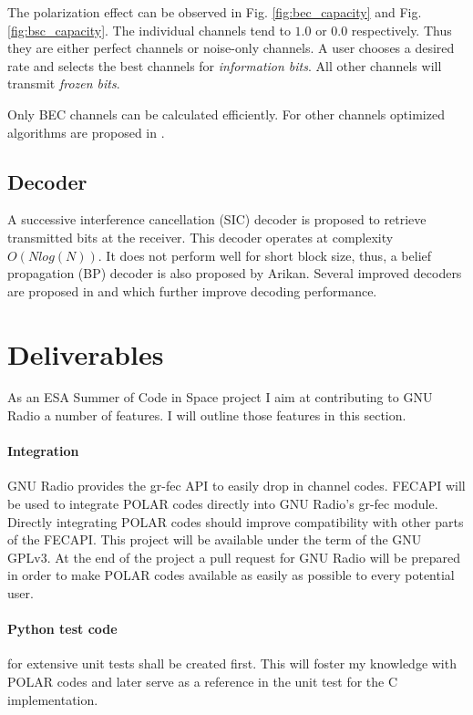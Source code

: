 \documentclass[a4paper,12pt]{scrartcl}
\def\CC{{C\nolinebreak[4]\hspace{-.05em}\raisebox{.4ex}{\tiny\textbf{++}}}}
\begin{document}
The polarization effect can be observed in Fig. \ref{fig:bec_capacity} and Fig. \ref{fig:bsc_capacity}.
The individual channels tend to $1.0$ or $0.0$ respectively.
Thus they are either perfect channels or noise-only channels.
A user chooses a desired rate and selects the best channels for \textit{information bits}.
All other channels will transmit \textit{frozen bits}.

Only \ac{BEC} channels can be calculated efficiently.
For other channels optimized algorithms are proposed in \cite{tal2013construct}.

\subsection{Decoder}
A successive interference cancellation (SIC) decoder is proposed to retrieve transmitted bits at the receiver.
This decoder operates at complexity $O( N log(N) )$.
It does not perform well for short block size, thus, a belief propagation (BP) decoder is also proposed by Arikan.
Several improved decoders are proposed in \cite{chen2013improved} and \cite{li2012adaptive} which further improve decoding performance.


\section{Deliverables}
As an ESA Summer of Code in Space project I aim at contributing to GNU Radio a number of features.
I will outline those features in this section.

\paragraph{Integration} GNU Radio provides the gr-fec API to easily drop in channel codes.
FECAPI will be used to integrate POLAR codes directly into GNU Radio's gr-fec module.
Directly integrating POLAR codes should improve compatibility with other parts of the FECAPI.
This project will be available under the term of the GNU GPLv3.
At the end of the project a pull request for GNU Radio will be prepared in order to make POLAR codes available as easily as possible to every potential user.

\paragraph{Python test code} for extensive unit tests shall be created first.
This will foster my knowledge with POLAR codes and later serve as a reference in the unit test for the \CC{} implementation.
\end{document}
